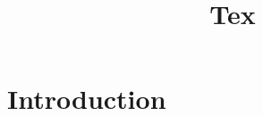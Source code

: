 \documentclass{article}
\title{Tex}
\date{}
\begin{document}
\maketitle

\section{Introduction}
\end{document}
